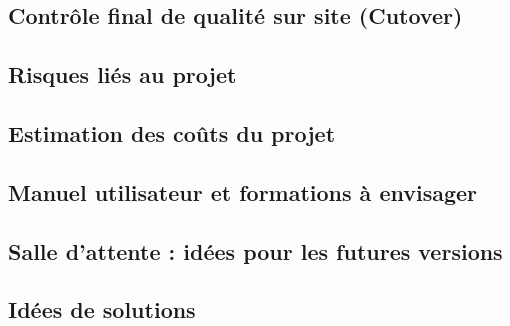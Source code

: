 \documentclass[a4]{article}
\begin{document}
		\subsection{Contrôle final de qualité sur site (Cutover)}
		\subsection{Risques liés au projet}
		\subsection{Estimation des coûts du projet}
		\subsection{Manuel utilisateur et formations à envisager}
		\subsection{Salle d’attente : idées pour les futures versions}
		\subsection{Idées de solutions}
\end{document}
